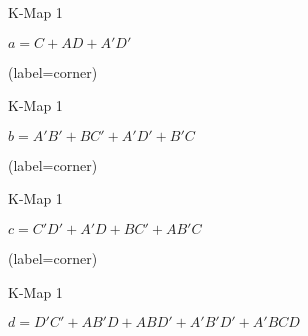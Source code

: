\begin{enumerate}
\begin{latin}
\begin{minipage}{0.48\textwidth}
\begin{karnaugh-map}[4][4][1][$B$][$A$][$D$][$C$]
			\end{karnaugh-map}
			\caption{K-Map 1}
			$a=C+AD+A'D'$
		\end{minipage}
		\hfill
		\begin{minipage}{0.48\textwidth}
			\centering
			\begin{karnaugh-map}[4][4][1][$B$][$A$][$D$][$C$](label=corner)
			\end{karnaugh-map}
			\caption{K-Map 1}
			$b=A'B'+BC'+A'D'+B'C$
		\end{minipage}	
	\end{latin}
	
	
	
	
	
	\begin{latin}
		\begin{minipage}{0.48\textwidth}
			\centering
			\begin{karnaugh-map}[4][4][1][$B$][$A$][$D$][$C$](label=corner)
				
			\end{karnaugh-map}
			\caption{K-Map 1}
			$c=C'D'+A'D+BC'+AB'C$
		\end{minipage}
		\hfill
		\begin{minipage}{0.48\textwidth}
			\centering
			\begin{karnaugh-map}[4][4][1][$B$][$A$][$D$][$C$](label=corner)
			\end{karnaugh-map}
			\caption{K-Map 1}
			$d=D'C'+AB'D+ABD'+A'B'D'+A'BCD$
		\end{minipage}	
	\end{latin}
	
	
	
	
	

\end{enumerate}
